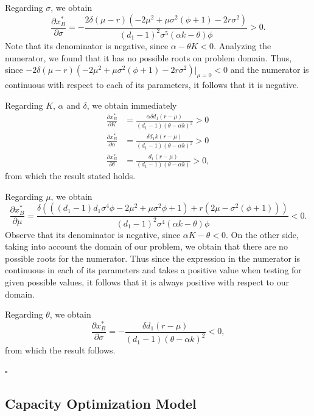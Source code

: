 Regarding $\sigma$, we obtain
$$\frac{\partial x^*_B}{\partial \sigma}=-\frac{2 \delta  (\mu -r) \left(-2 \mu ^2+\mu  \sigma ^2 \left(\phi+1\right)-2 r \sigma ^2\right)}{(d_1-1)^2 \sigma ^5 (\alpha  k-\theta ) \phi}>0.$$
Note that its denominator is negative, since $\alpha-\theta K<0$.
Analyzing the numerator, we found that it has no possible roots on problem domain. Thus, since $-2 \delta  (\mu -r) \left(-2 \mu ^2+\mu  \sigma ^2 \left(\phi+1\right)-2 r \sigma ^2\right) |_{\mu=0}<0$ and the numerator is continuous with respect to each of its parameters, it follows that it is negative.



Regarding $K$, $\alpha$ and $\delta$, we obtain immediately 
\begin{align*}
\frac{\partial x^*_B}{\partial K}&=\frac{\alpha  \delta  d_1 (r-\mu )}{(d_1-1) (\theta -\alpha  k)^2}>0\\
\frac{\partial x^*_B}{\partial \alpha}&=\frac{\delta  d_1 k (r-\mu )}{(d_1-1) (\theta -\alpha  k)^2}>0\\
\frac{\partial x^*_B}{\partial \delta}&=\frac{d_1 (r-\mu )}{(d_1-1) (\theta -\alpha  k)}>0,
\end{align*}
from which the result stated holds.


Regarding $\mu$, we obtain
$$\frac{\partial x^*_B}{\partial \mu}=\frac{\delta  \left( \left( (d_1-1) d_1 \sigma ^4 \phi -2 \mu ^2+\mu  \sigma ^2 \phi+1 \right)+r \left(2 \mu -\sigma ^2 \left(\phi+1\right)\right)\right)}{(d_1-1)^2 \sigma ^4 (\alpha  k-\theta ) \phi}<0.$$
Observe that its denominator is negative, since $\alpha K - \theta <0$. On the other side, taking into account the domain of our problem, we obtain that there are no possible roots for the numerator. 
Thus since the expression in the numerator is continuous in each of its parameters and takes a positive value when testing for given possible values, it follows that it is always positive with respect to our domain.

Regarding $\theta$, we obtain
$$\frac{\partial x^*_B}{\partial \sigma}=-\frac{\delta  d_1 (r-\mu )}{(d_1-1) (\theta -\alpha  k)^2}<0,$$
from which the result follows.
 
 
\begin{flushright}
 $\square$
\end{flushright}


\subsection{Capacity Optimization Model}

